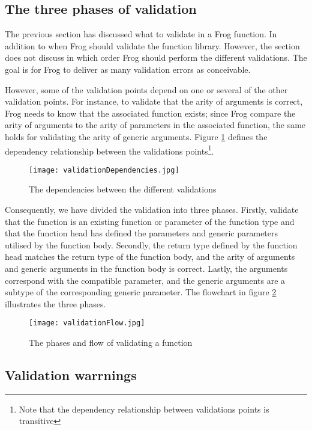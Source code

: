 \subsection{The three phases of validation}
The previous section has discussed what to validate in a Frog function. In addition to when Frog should validate the function library. However, the section does not discuss in which order Frog should perform the different validations. The goal is for Frog to deliver as many validation errors as conceivable. 

\para
However, some of the validation points depend on one or several of the other validation points. For instance, to validate that the arity of arguments is correct, Frog needs to know that the associated function exists; since Frog compare the arity of arguments to the arity of parameters in the associated function, the same holds for validating the arity of generic arguments. Figure \ref{fig:validationDependencies} defines the dependency relationship between the validations points\footnote{Note that the dependency relationship between validations points is transitive}. 

\begin{figure}
    \centering
    \texttt{[image: validationDependencies.jpg]}
    \caption{The dependencies between the different validations}
    \label{fig:validationDependencies}
\end{figure}

\para
Consequently, we have divided the validation into three phases. Firstly, validate that the function is an existing function or parameter of the function type and that the function head has defined the parameters and generic parameters utilised by the function body. Secondly, the return type defined by the function head matches the return type of the function body, and the arity of arguments and generic arguments in the function body is correct. Lastly, the arguments correspond with the compatible parameter, and the generic arguments are a subtype of the corresponding generic parameter. The flowchart in figure \ref{fig:LC-explenations} illustrates the three phases. 

\begin{figure}
    \centering
    \texttt{[image: validationFlow.jpg]}
    \caption{The phases and flow of validating a function}
    \label{fig:LC-explenations}
\end{figure}

\subsection{Validation warrnings}


